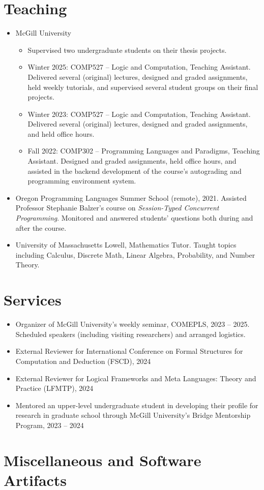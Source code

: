 \documentclass[11pt]{article}
\begin{document}
\section*{Teaching}
\begin{itemize}[leftmargin=*]
  \item McGill University
    \begin{itemize}
      \item Supervised two undergraduate students on their thesis projects.
      \item Winter 2025: COMP527 – Logic and Computation, Teaching Assistant. Delivered several (original) lectures, designed and graded assignments, held weekly tutorials, and supervised several student groups on their final projects.
      \item Winter 2023: COMP527 – Logic and Computation, Teaching Assistant. Delivered several (original) lectures, designed and graded assignments, and held office hours.
      \item Fall 2022: COMP302 – Programming Languages and Paradigms, Teaching Assistant. Designed and graded assignments, held office hours, and assisted in the backend development of the course's autograding and programming environment system.
    \end{itemize}
  \item Oregon Programming Languages Summer School (remote), 2021. Assisted Professor Stephanie Balzer's course on \emph{Session-Typed Concurrent Programming}. Monitored and answered students' questions both during and after the course.
  \item University of Massachusetts Lowell, Mathematics Tutor. Taught topics including Calculus, Discrete Math, Linear Algebra, Probability, and Number Theory.
\end{itemize}

\section*{Services}
\begin{itemize}[leftmargin=*]
  \item Organizer of McGill University's weekly seminar, COMEPLS, 2023 -- 2025. Scheduled speakers (including visiting researchers) and arranged logistics.
  \item External Reviewer for International Conference on Formal Structures for Computation and Deduction (FSCD), 2024
  \item External Reviewer for Logical Frameworks and Meta Languages: Theory and Practice (LFMTP), 2024
  \item Mentored an upper-level undergraduate student in developing their profile for research in graduate school through McGill University's Bridge Mentorship Program, 2023 -- 2024
\end{itemize}



\section*{Miscellaneous and Software Artifacts}
\nocite{*}
\printbibliography[heading=none, type=software, resetnumbers=true]
\end{document}
